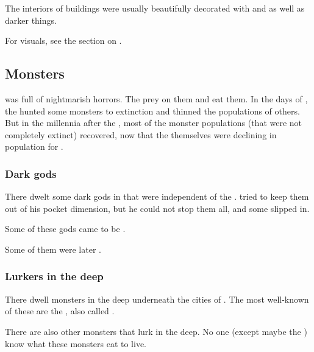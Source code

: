 The interiors of buildings were usually beautifully decorated with  and  as well as darker things. 

For visuals, see the section on . 









\subsection{Monsters}
\Nyx{} was full of nightmarish horrors. 
The \resphain{} prey on them and eat them. 
In the days of \Merkyrah, the \resphain{} hunted some monsters to extinction and thinned the populations of others. 
But in the millennia after the , most of the monster populations (that were not completely extinct) recovered, now that the \resphain{} themselves were declining in population for . 





\subsubsection{Dark gods}
There dwelt some dark gods in \Nyx{} that were independent of the \banes. 
\Daggerrain{} tried to keep them out of his pocket dimension, but he could not stop them all, and some slipped in. 

Some of these gods came to be . 

Some of them were later . 





\subsubsection{Lurkers in the deep}
There dwell monsters in the deep underneath the cities of \Nyx. 
The most well-known of these are the \mothlain, also called . 

There are also other monsters that lurk in the deep. 
No one (except maybe the ) know what these monsters eat to live. 






